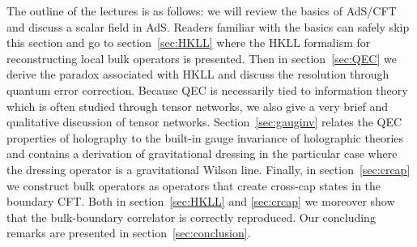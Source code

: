 \documentclass{PoS}
\begin{document}
The outline of the lectures is as follows: we will review the basics of AdS/CFT and discuss a scalar field in AdS. Readers familiar with the basics can safely skip this section and go to section~\ref{sec:HKLL} where the HKLL formalism for reconstructing local bulk operators is presented. Then in section~\ref{sec:QEC} we derive the paradox associated with HKLL and discuss the resolution through quantum error correction. Because QEC is necessarily tied to information theory which is often studied through tensor networks, we also give a very brief and qualitative discussion of tensor networks. Section~\ref{sec:gauginv} relates the QEC properties of holography to the built-in gauge invariance of holographic theories and contains a derivation of gravitational dressing in the particular case where the dressing operator is a gravitational Wilson line. Finally, in section~\ref{sec:crcap} we construct bulk operators as operators that create cross-cap states in the boundary CFT. Both in section~\ref{sec:HKLL} and \ref{sec:crcap} we moreover show that the bulk-boundary correlator is correctly reproduced. Our concluding remarks are presented in section~\ref{sec:conclusion}.
\end{document}
